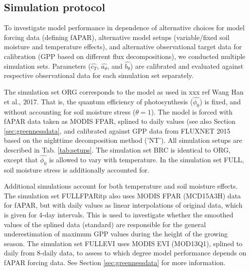 \documentclass{myreport}
\begin{document}
\subsection{Simulation protocol}
\label{sec:protocol}
To investigate model performance in dependence of alternative choices for model forcing data (defining fAPAR), alternative model setups (variable/fixed soil moisture and temperature effects), and alternative observational target data for calibration (GPP based on different flux decompositions), we conducted multiple simulation sets. Parameters ($\widehat{c_T}$, $\widehat{a_{\theta}}$, and $\widehat{b_{\theta}}$) are calibrated and evaluated against respective observational data for each simulation set separately.

The simulation set ORG corresponds to the model as used in xxx ref Wang Han et al., 2017. That is, the quantum efficiency of photosynthesis ($\widehat{\phi_0}$) is fixed, and without accounting for soil moisture stress ($\theta=1$). The model is forced with fAPAR data taken as MODIS FPAR, splined to daily values (see also Section \ref{sec:greennessdata}, and calibrated against GPP data from FLUXNET 2015 based on the nighttime decomposition method ('NT'). All simulation setups are described in Tab. \ref{tab:setups}. The simulation set BRC is identical to ORG, except that  $\widehat{\phi_0}$ is allowed to vary with temperature. In the simulation set FULL, soil moisture stress is additionally accounted for.

Additional simulations account for both temperature and soil moisture effects. The simulation set FULL\textunderscore FPARitp also uses MODIS FPAR (MCD15A3H) data for fAPAR, but with daily values as linear interpolations of original data, which is given for 4-day intervals. This is used to investigate whether the smoothed values of the splined data (standard) are responsible for the general underestimation of maximum GPP values during the height of the growing season. The simulation set FULL\textunderscore EVI uses MODIS EVI (MOD13Q1), splined to daily from 8-daily data, to assess to which degree model performance depends on fAPAR forcing data. See Section \ref{sec:greennessdata} for more information.
\end{document}
